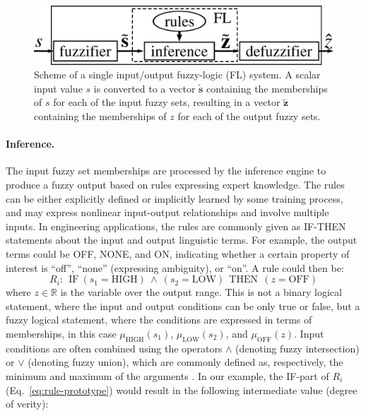\begin{figure}[!t]
	\centering
	\includegraphics[width=0.5\columnwidth]{fig5}
	\caption{Scheme of a single input/output fuzzy-logic (FL) system. A scalar input value $s$ is converted to a vector $\tilde{\mathbf{s}}$ containing the memberships of $s$ for each of the input fuzzy sets, resulting in a vector $\tilde{\mathbf{z}}$ containing the memberships of $z$ for each of the output fuzzy sets.}
	\label{fig:fls-general}
\end{figure}

\paragraph{Inference.} The input fuzzy set memberships are processed by the inference engine to produce a fuzzy output based on rules expressing expert knowledge. The rules can be either explicitly defined or implicitly learned by some training process, and may express nonlinear input-output relationships and involve multiple inputs. In engineering applications, the rules are commonly given as IF-THEN statements about the input and output linguistic terms. For example, the output terms could be OFF, NONE, and ON, indicating whether a certain property of interest is ``off'', ``none'' (expressing ambiguity), or ``on''. A rule could then be:%
\begin{equation}
R_{i} \! : \ \  \textrm{IF} \  (s_{1}=\textrm{HIGH})\ \wedge\ (s_{2}=\textrm{LOW})\ \ \textrm{THEN}\ \ (z=\textrm{OFF})
\label{eq:rule-prototype}
\end{equation}
where $z\in\mathbb{R}$ is the variable over the output range. This is not a binary logical statement, where the input and output conditions can be only true or false, but a fuzzy logical statement, where the conditions are expressed in terms of memberships, in this case $\mu_{\textrm{HIGH}}(s_{1})$, $\mu_{\textrm{LOW}}(s_{2})$, and $\mu_{\textrm{OFF}}(z)$. Input conditions are often combined using the operators $\wedge$ (denoting fuzzy intersection) or $\vee$ (denoting fuzzy union), which are commonly defined as, respectively, the minimum and maximum of the arguments \cite{mendel1995fuzzy}. In our example, the IF-part of $R_{i}$ (Eq.~\ref{eq:rule-prototype}) would result in the following intermediate value (degree of verity):
